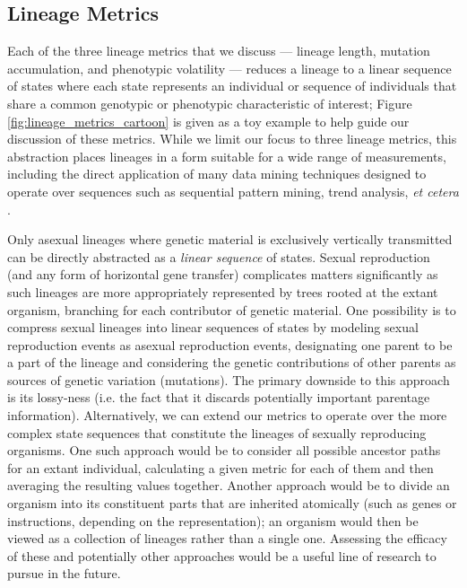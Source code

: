 \documentclass[letterpaper]{article}
\begin{document}
\subsection{Lineage Metrics}
Each of the three lineage metrics that we discuss --- lineage length, mutation accumulation, and phenotypic volatility --- reduces a lineage to a linear sequence of states where each state represents an individual or sequence of individuals that share a common genotypic or phenotypic characteristic of interest; Figure \ref{fig:lineage_metrics_cartoon} is given as a toy example to help guide our discussion of these metrics. 
While we limit our focus to three lineage metrics, this abstraction places lineages in a form suitable for a wide range of measurements, including the direct application of many data mining techniques designed to operate over sequences such as sequential pattern mining, trend analysis, \textit{et cetera} \citep{han2011data}. 

Only asexual lineages %
where genetic material is exclusively vertically transmitted can be directly abstracted as a \textit{linear sequence} of states.
Sexual reproduction (and any form of horizontal gene transfer) complicates matters significantly as such lineages are more appropriately represented by trees rooted at the extant organism, branching for each contributor of genetic material. 
One possibility is to compress sexual lineages into linear sequences of states by modeling sexual reproduction events as asexual reproduction events, designating one parent to be a part of the lineage and considering the genetic contributions of other parents as sources of genetic variation (mutations). The primary downside to this approach is its lossy-ness (i.e. the fact that it discards potentially important parentage information). 
Alternatively, we can extend our metrics to operate over the more complex state sequences that constitute the lineages of sexually reproducing organisms. One such approach would be to consider all possible ancestor paths for an extant individual, calculating a given metric for each of them and then averaging the resulting values together. Another approach would be to divide an organism into its constituent parts that are inherited atomically (such as genes or instructions, depending on the representation); an organism would then be viewed as a collection of lineages rather than a single one. 
Assessing the efficacy of these and potentially other approaches would be a useful line of research to pursue in the future.
\end{document}
